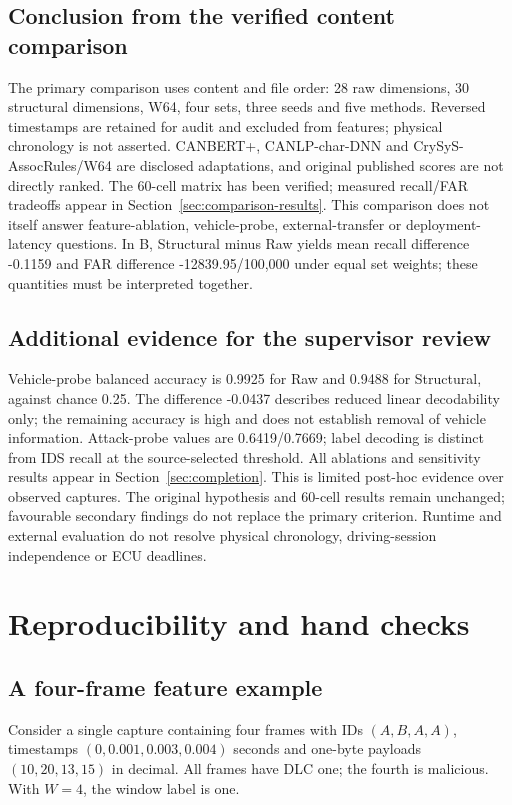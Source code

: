 \documentclass[12pt,a4paper,oneside,openany]{extbook}
\begin{document}
\section{Conclusion from the verified content comparison}
The primary comparison uses content and file order: 28 raw dimensions, 30 structural dimensions, W64, four sets, three seeds and five methods. Reversed timestamps are retained for audit and excluded from features; physical chronology is not asserted. CANBERT+, CANLP-char-DNN and CrySyS-AssocRules/W64 are disclosed adaptations, and original published scores are not directly ranked. The 60-cell matrix has been verified; measured recall/FAR tradeoffs appear in Section~\ref{sec:comparison-results}. This comparison does not itself answer feature-ablation, vehicle-probe, external-transfer or deployment-latency questions. In B, Structural minus Raw yields mean recall difference -0.1159 and FAR difference -12839.95/100,000 under equal set weights; these quantities must be interpreted together.

\section{Additional evidence for the supervisor review}
Vehicle-probe balanced accuracy is 0.9925 for Raw and 0.9488 for Structural, against chance 0.25. The difference -0.0437 describes reduced linear decodability only; the remaining accuracy is high and does not establish removal of vehicle information. Attack-probe values are 0.6419/0.7669; label decoding is distinct from IDS recall at the source-selected threshold.
All ablations and sensitivity results appear in Section~\ref{sec:completion}. This is limited post-hoc evidence over observed captures. The original hypothesis and 60-cell results remain unchanged; favourable secondary findings do not replace the primary criterion. Runtime and external evaluation do not resolve physical chronology, driving-session independence or ECU deadlines.


\appendix
\chapter{Reproducibility and hand checks}\label{app:reproducibility}
\section{A four-frame feature example}
Consider a single capture containing four frames with IDs $(A,B,A,A)$, timestamps $(0,0.001,0.003,0.004)$ seconds and one-byte payloads $(10,20,13,15)$ in decimal. All frames have DLC one; the fourth is malicious. With $W=4$, the window label is one.
\end{document}

